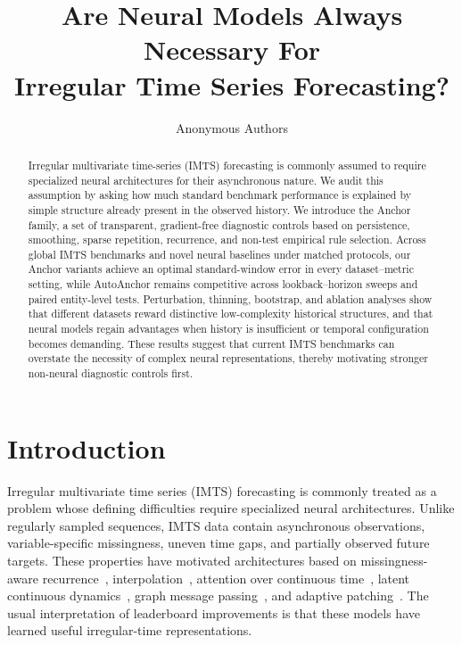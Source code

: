 \documentclass{article}
\title{Are Neural Models Always Necessary For \\ Irregular Time Series Forecasting?}
\author{Anonymous Authors}
\begin{document}
\maketitle


\begin{abstract}
Irregular multivariate time-series (IMTS) forecasting is commonly assumed to require specialized neural architectures for their asynchronous nature. We audit this assumption by asking how much standard benchmark performance is explained by simple structure already present in the observed history. We introduce the Anchor family, a set of transparent, gradient-free diagnostic controls based on persistence, smoothing, sparse repetition, recurrence, and non-test empirical rule selection. Across global IMTS benchmarks and novel neural baselines under matched protocols, our Anchor variants achieve an optimal standard-window error in every dataset--metric setting, while AutoAnchor remains competitive across lookback--horizon sweeps and paired entity-level tests. Perturbation, thinning, bootstrap, and ablation analyses show that different datasets reward distinctive low-complexity historical structures, and that neural models regain advantages when history is insufficient or temporal configuration becomes demanding. These results suggest that current IMTS benchmarks can overstate the necessity of complex neural representations, thereby motivating stronger non-neural diagnostic controls first.
\end{abstract}


\section{Introduction}

Irregular multivariate time series (IMTS) forecasting is commonly treated as a
problem whose defining difficulties require specialized neural architectures.
Unlike regularly sampled sequences, IMTS data contain asynchronous observations,
variable-specific missingness, uneven time gaps, and partially observed future
targets. These properties have motivated architectures based on missingness-aware
recurrence~\citep{grud}, interpolation~\citep{shukla2019interp}, attention
over continuous time~\citep{mtan,primenet}, latent continuous
dynamics~\citep{neuralode2,latentODE,neuralCDE,neuralflows2,cru}, graph message
passing~\citep{raindrop2,gneuralflow,grafiti}, and adaptive
patching~\citep{tPatchGNN,apn}. The usual interpretation of leaderboard
improvements is that these models have learned useful irregular-time
representations.
\end{document}
